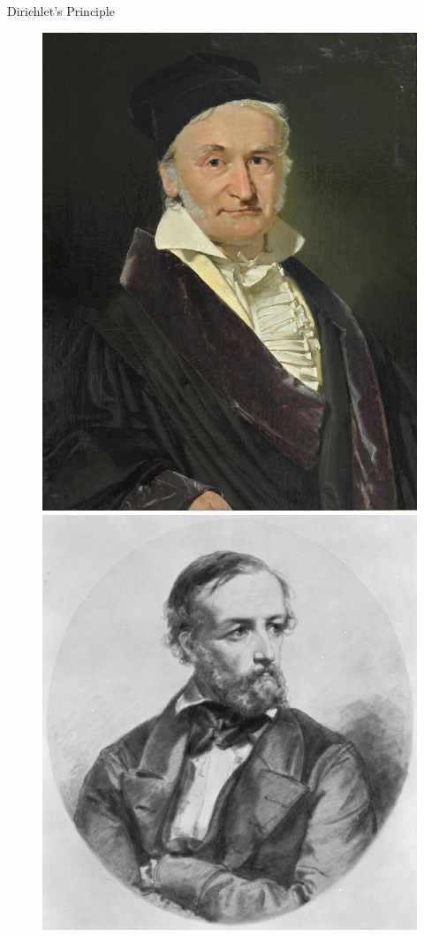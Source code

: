 \documentclass[aspectratio=169,xcolor=dvipsnames,11pt]{beamer}
\begin{document}
\begin{frame}{Dirichlet's Principle}
\begin{minipage}{0.3\textwidth}
\begin{figure}
\begin{minipage}[b]{0.455\textwidth}
    \includegraphics[width=\linewidth]{figures/gauss.jpg}
  \end{minipage}
  \vspace{1em}
  \begin{minipage}[b]{0.45\textwidth}
    \includegraphics[width=\linewidth]{figures/dirichlet.jpg}

\end{minipage}
\end{figure}
\end{minipage}
\end{frame}
\end{document}
